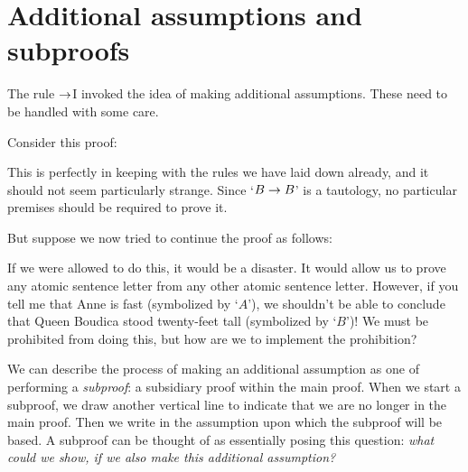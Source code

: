 \section{Additional assumptions and subproofs}
The rule $\rightarrow$I invoked the idea of making additional assumptions. These need to be handled with some care.

Consider this proof:
\begin{pf}
	\open
		 
	\close
\end{pf}
This is perfectly in keeping with the rules we have laid down already, and it should not seem particularly strange. Since `$B \rightarrow B$' is a tautology, no particular premises should be required to prove it. 

But suppose we now tried to continue the proof as follows:
\begin{pf}
	\open
		 
	\close
\end{pf}
If we were allowed to do this, it would be a disaster. It would allow us to prove any atomic sentence letter from any other atomic sentence letter. However, if you tell me that Anne is fast (symbolized by `$A$'), we shouldn't be able to conclude that Queen Boudica stood twenty-feet tall (symbolized by `$B$')! We must be prohibited from doing this, but how are we to implement the prohibition?

We can describe the process of making an additional assumption as one of performing a \emph{subproof}: a subsidiary proof within the main proof. When we start a subproof, we draw another vertical line to indicate that we are no longer in the main proof. Then we write in the assumption upon which the subproof will be based. A subproof can be thought of as essentially posing this question: \emph{what could we show, if we also make this additional assumption?}

